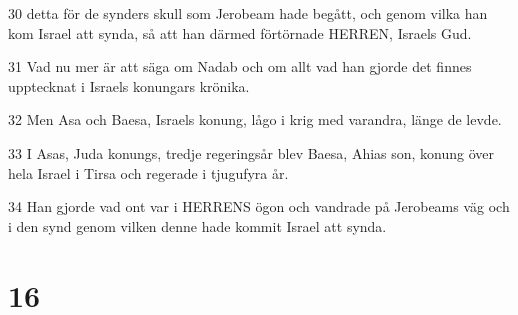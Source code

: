 \par 30 detta för de synders skull som Jerobeam hade begått, och genom vilka han kom Israel att synda, så att han därmed förtörnade HERREN, Israels Gud.
\par 31 Vad nu mer är att säga om Nadab och om allt vad han gjorde det finnes upptecknat i Israels konungars krönika.
\par 32 Men Asa och Baesa, Israels konung, lågo i krig med varandra, länge de levde.
\par 33 I Asas, Juda konungs, tredje regeringsår blev Baesa, Ahias son, konung över hela Israel i Tirsa och regerade i tjugufyra år.
\par 34 Han gjorde vad ont var i HERRENS ögon och vandrade på Jerobeams väg och i den synd genom vilken denne hade kommit Israel att synda.

\chapter{16}


